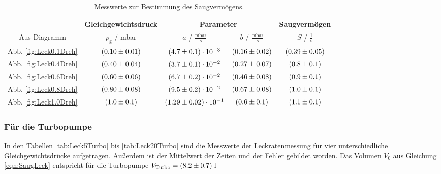 \begin{table}[H]
   \centering
   \caption{Messwerte zur Bestimmung des Saugvermögens.}
   \label{tab:SaugLeckDreh}
   \begin{tabular}{c|c|c|c|c}
     & Gleichgewichtsdruck & \multicolumn{2}{c|}{Parameter} & Saugvermögen \\
     \hline
     Aus Diagramm & $p_\text{g}$ / mbar & $a$ / $\frac{\text{mbar}}{\text{s}}$ & $b$ / $\frac{\text{mbar}}{\text{s}}$ & $S$ / $\frac{\text{l}}{\text{s}}$ \\
     \hline
     Abb. \eqref{fig:Leck0.1Dreh} & $(\num{0.1 +- 0.01})$ & $(\num{4.7 +- 0.1}) \cdot 10^{-3}$ & $(\num{0.16 +- 0.02})$ & $(\num{0.39 +- 0.05})$ \\
     Abb. \eqref{fig:Leck0.4Dreh} & $(\num{0.4 +- 0.04})$ & $(\num{3.7 +- 0.1}) \cdot 10^{-2} $ & $(\num{0.27 +- 0.07}) $ & $(\num{0.8 +- 0.1}) $ \\
     Abb. \eqref{fig:Leck0.6Dreh} & $(\num{0.6 +- 0.06})$ & $(\num{6.7 +- 0.2}) \cdot 10^{-2} $ & $(\num{0.46 +- 0.08}) $ & $(\num{0.9 +- 0.1}) $ \\
     Abb. \eqref{fig:Leck0.8Dreh} & $(\num{0.8 +- 0.08})$ & $(\num{9.5 +- 0.2}) \cdot 10^{-2} $ & $(\num{0.67 +- 0.08}) $ & $(\num{1.0 +- 0.1}) $ \\
     Abb. \eqref{fig:Leck1.0Dreh} & $(\num{1.0 +- 0.1})$ & $(\num{1.29 +- 0.02}) \cdot 10^{-1} $ & $(\num{0.6 +- 0.1}) $ & $(\num{1.1 +- 0.1}) $ \\
 \end{tabular}
\end{table}



\subsubsection{Für die Turbopumpe}
In den Tabellen \eqref{tab:Leck5Turbo} bis \eqref{tab:Leck20Turbo} sind die Messwerte der Leckratenmessung für vier unterschiedliche Gleichgewichtsdrücke aufgetragen. Außerdem ist der Mittelwert der Zeiten und der Fehler gebildet worden. Das Volumen $V_0$ aus Gleichung \eqref{eqn:SaugLeck} entspricht für die Turbopumpe $V_\text{Turbo} = (\num{8.2 +- 0.7})$\,l

